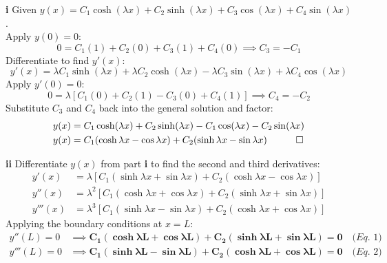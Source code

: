 \begin{solution}
\textbf{i} Given $y(x) = C_1 \cosh(\lambda x) + C_2 \sinh(\lambda x) + C_3 \cos(\lambda x) + C_4 \sin(\lambda x)$. \\
Apply $y(0) = 0$:
\[ 0 = C_1(1) + C_2(0) + C_3(1) + C_4(0) \implies C_3 = -C_1 \]
Differentiate to find $y'(x)$:
\[ y'(x) = \lambda C_1 \sinh(\lambda x) + \lambda C_2 \cosh(\lambda x) - \lambda C_3 \sin(\lambda x) + \lambda C_4 \cos(\lambda x) \]
Apply $y'(0) = 0$:
\[ 0 = \lambda[C_1(0) + C_2(1) - C_3(0) + C_4(1)] \implies C_4 = -C_2 \]
Substitute $C_3$ and $C_4$ back into the general solution and factor:
\begin{align*}
    y(x) &= C_1 \cosh(\lambda x) + C_2 \sinh(\lambda x) - C_1 \cos(\lambda x) - C_2 \sin(\lambda x) \\
    y(x) &= C_1(\cosh \lambda x - \cos \lambda x) + C_2(\sinh \lambda x - \sin \lambda x) \quad \qed
\end{align*}

\vspace{0.3cm}
\textbf{ii} Differentiate $y(x)$ from part \textbf{i} to find the second and third derivatives:
\begin{align*}
    y'(x) &= \lambda [C_1(\sinh \lambda x + \sin \lambda x) + C_2(\cosh \lambda x - \cos \lambda x)] \\
    y''(x) &= \lambda^2 [C_1(\cosh \lambda x + \cos \lambda x) + C_2(\sinh \lambda x + \sin \lambda x)] \\
    y'''(x) &= \lambda^3 [C_1(\sinh \lambda x - \sin \lambda x) + C_2(\cosh \lambda x + \cos \lambda x)]
\end{align*}
Applying the boundary conditions at $x=L$:
\begin{align*}
    y''(L) = 0 &\implies \mathbf{C_1(\cosh \lambda L + \cos \lambda L) + C_2(\sinh \lambda L + \sin \lambda L) = 0} \quad \textit{(Eq. 1)} \\
    y'''(L) = 0 &\implies \mathbf{C_1(\sinh \lambda L - \sin \lambda L) + C_2(\cosh \lambda L + \cos \lambda L) = 0} \quad \textit{(Eq. 2)}
\end{align*}


\end{solution}
